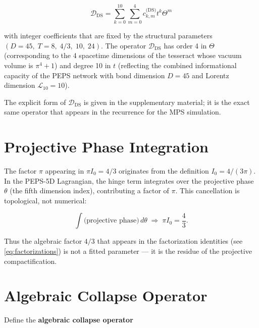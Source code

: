 \documentclass[12pt]{article}
\begin{document}
\begin{equation}
\mathcal{D}_{\text{DS}} = \sum_{k=0}^{10} \sum_{m=0}^{4} c_{k,m}^{\text{(DS)}} t^k \Theta^m
\label{eq:ds_operator}
\end{equation}

with integer coefficients that are fixed by the structural parameters
\((D=45,\; T=8,\; 4/3,\; 10,\; 24)\). The operator \(\mathcal{D}_{\text{DS}}\)
has order 4 in \(\Theta\) (corresponding to the 4 spacetime dimensions of the
tesseract whose vacuum volume is \(\pi^4+1\)) and degree 10 in \(t\) (reflecting
the combined informational capacity of the PEPS network with bond dimension
\(D=45\) and Lorentz dimension \(\mathcal{L}_{10}=10\)).

The explicit form of \(\mathcal{D}_{\text{DS}}\) is given in the supplementary
material; it is the exact same operator that appears in the recurrence for the
MPS simulation.

\section{Projective Phase Integration}

The factor \(\pi\) appearing in \(\pi I_0 = 4/3\) originates from the definition
\(I_0 = 4/(3\pi)\). In the PEPS-5D Lagrangian, the hinge term integrates over
the projective phase \(\theta\) (the fifth dimension index), contributing a
factor of \(\pi\). This cancellation is topological, not numerical:

\begin{equation}
\int \text{(projective phase)} \, d\theta \;\Longrightarrow\; \pi I_0 = \frac{4}{3}.
\label{eq:projective}
\end{equation}

Thus the algebraic factor \(4/3\) that appears in the factorization identities
(see \eqref{eq:factorizations}) is not a fitted parameter — it is the residue of
the projective compactification.

\section{Algebraic Collapse Operator}

Define the \textbf{algebraic collapse operator}
\end{document}
